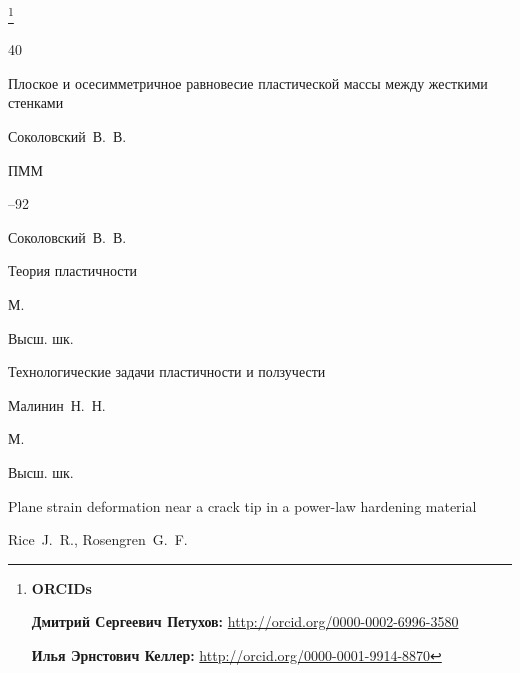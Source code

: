 %



\thanks{{\bf ORCIDs}



{\bf  Дмитрий Сергеевич Петухов:}    \url{http://orcid.org/0000-0002-6996-3580}



{\bf Илья Эрнстович Келлер:}    \url{http://orcid.org/0000-0001-9914-8870}

}





\RusRef

\begin{thebibliography}{40}




\paper Плоское и осесимметричное равновесие пластической массы между жесткими стенками

\by Соколовский~В.~В.

\jour ПММ




--92





\by Соколовский~В.~В.

\book Теория пластичности

\publaddr М.

\publ Высш. шк.






\book Технологические задачи пластичности и ползучести

\by Малинин~Н.~Н.

\publaddr М.

\publ Высш. шк.






\paper Plane strain deformation near a crack tip in a power-law hardening material

\by    Rice~J.~R., Rosengren~G.~F.


\end{thebibliography}
